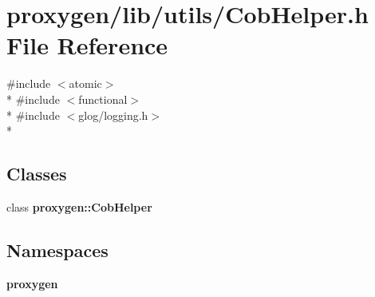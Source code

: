 \section{proxygen/lib/utils/\+Cob\+Helper.h File Reference}
\label{CobHelper_8h}
{\ttfamily \#include $<$atomic$>$}\\*
{\ttfamily \#include $<$functional$>$}\\*
{\ttfamily \#include $<$glog/logging.\+h$>$}\\*
\subsection*{Classes}
\begin{DoxyCompactItemize}
\item 
class {\bf proxygen\+::\+Cob\+Helper}
\end{DoxyCompactItemize}
\subsection*{Namespaces}
\begin{DoxyCompactItemize}
\item 
 {\bf proxygen}
\end{DoxyCompactItemize}
